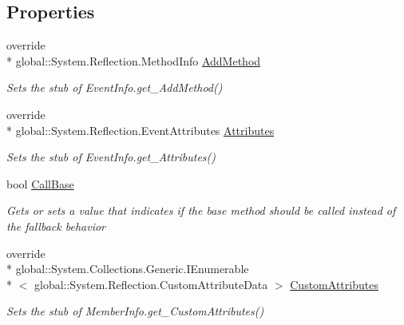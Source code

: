 \subsection*{Properties}
\begin{DoxyCompactItemize}
\item 
override \\*
global\-::\-System.\-Reflection.\-Method\-Info \hyperlink{class_system_1_1_reflection_1_1_fakes_1_1_stub_event_info_a81e931c218dd8407b89ca9a394e5cac3}{Add\-Method}
\begin{DoxyCompactList}\small\item\em Sets the stub of Event\-Info.\-get\-\_\-\-Add\-Method()\end{DoxyCompactList}\item 
override \\*
global\-::\-System.\-Reflection.\-Event\-Attributes \hyperlink{class_system_1_1_reflection_1_1_fakes_1_1_stub_event_info_a575ee139fda4b64da3c862647142b746}{Attributes}
\begin{DoxyCompactList}\small\item\em Sets the stub of Event\-Info.\-get\-\_\-\-Attributes()\end{DoxyCompactList}\item 
bool \hyperlink{class_system_1_1_reflection_1_1_fakes_1_1_stub_event_info_a7b692c013c69979647f44ed8f0bac0e2}{Call\-Base}
\begin{DoxyCompactList}\small\item\em Gets or sets a value that indicates if the base method should be called instead of the fallback behavior\end{DoxyCompactList}\item 
override \\*
global\-::\-System.\-Collections.\-Generic.\-I\-Enumerable\\*
$<$ global\-::\-System.\-Reflection.\-Custom\-Attribute\-Data $>$ \hyperlink{class_system_1_1_reflection_1_1_fakes_1_1_stub_event_info_aa830c0f2ef29c6a3d0021b3e48be709c}{Custom\-Attributes}
\begin{DoxyCompactList}\small\item\em Sets the stub of Member\-Info.\-get\-\_\-\-Custom\-Attributes()\end{DoxyCompactList}\item 

\end{DoxyCompactItemize}
